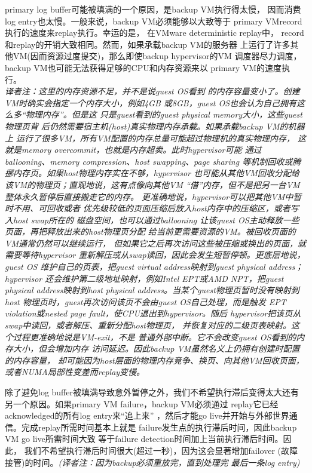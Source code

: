 primary log buffer可能被填满的一个原因，是backup VM执行得太慢，%
因而消费log entry也太慢。一般来说，backup VM必须能够以大致等于%
primary VMrecord执行的速度来replay执行。幸运的是，%
在VMware deterministic replay中，%
record和replay的开销大致相同。然而，如果承载backup VM的服务器%
上运行了许多其他VM(因而资源过度提交)，那么即使backup hypervisor的VM%
调度器尽力调度，backup VM也可能无法获得足够的CPU和内存资源来以%
primary VM的速度执行。
\\\emph{译者注：这里的内存资源不足，并不是说guest OS看到%
的内存容量变小了。创建VM时确实会指定一个内存大小，例如4GB%
或8GB，guest OS也会认为自己拥有这么多“物理内存”。但是这%
只是guest看到的guest physical memory大小，这些guest物理页背%
后仍然需要宿主机(host)真实物理内存承载。如果承载backup VM的机器上%
运行了很多VM，所有VM配置的内存总量可能超过物理机的真实物理内存，%
这就是memory overcommit，也就是内存超卖。此时hypervisor可能%
通过ballooning、memory compression、host swapping、page sharing%
等机制回收或腾挪内存页。如果host物理内存实在不够，hypervisor%
也可能从其他VM回收分配给该VM的物理页；直观地说，这有点像向其他VM%
“借”内存，但不是把另一台VM整体永久暂停后直接搬走它的内存。%
更准确地说，hypervisor可以把其他VM中暂时不用、可回收或者%
优先级较低的页面压缩后放入host内存中的压缩区，或者写入host swap所在的%
磁盘空间，也可以通过ballooning%
让该guest OS主动释放一些页面，再把释放出来的host物理页分配%
给当前更需要资源的VM。被回收页面的VM通常仍然可以继续运行，%
但如果它之后再次访问这些被压缩或换出的页面，就需要等待hypervisor%
重新解压或从swap读回，因此会发生短暂停顿。更底层地说，guest OS%
维护自己的页表，把guest virtual address映射到guest physical address；hypervisor%
还会维护第二级地址映射，例如Intel EPT或AMD NPT，把guest physical%
address映射到host physical address。当某个guest物理页暂时没有映射到host%
物理页时，guest再次访问该页不会由guest OS自己处理，而是触发%
EPT violation或nested page fault，使CPU退出到hypervisor。随后%
hypervisor把该页从swap中读回，或者解压、重新分配host物理页，%
并恢复对应的二级页表映射。这个过程更准确地说是VM-exit，不是%
普通外部中断。它不会改变guest OS看到的内存大小，但会增加内存%
访问延迟。因此backup VM虽然名义上仍拥有创建时配置的内存容量，%
却可能因为host层面的物理内存竞争、换页、向其他VM回收页面，%
或者NUMA局部性变差而replay变慢。}%

除了避免log buffer被填满导致意外暂停之外，我们不希望执行滞后变得太大还有%
另一个原因。如果primary VM failure，backup VM必须通过%
replay它已经acknowledged的所有log entry来“追上来”%
，然后才能go live并开始与外部世界通信。完成replay所需时间基本上就是%
failure发生点的执行滞后时间，因此backup VM go live所需时间大致%
等于failure detection时间加上当前执行滞后时间。因此，%
我们不希望执行滞后时间很大(超过一秒)，因为这会显著增加failover%
(故障接管)的时间。\emph{(译者注：因为backup必须重放完，直到处理完%
最后一条log entry)}%

